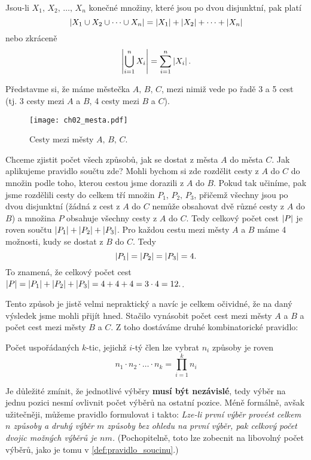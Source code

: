 \begin{theorem}
    Jsou-li $X_1,\,X_2,\,\dots,\,X_n$ konečné množiny, které jsou po dvou disjunktní, pak platí
    \begin{equation*}
        \left| X_1\cup X_2\cup\dots\cup X_n \right|=\left| X_1 \right|+\left| X_2 \right|+\dots+\left| X_n \right|
    \end{equation*}
    nebo zkráceně
    \begin{equation*}
        \left| \bigcup\limits_{i=1}^{n}X_i \right|=\sum_{i=1}^{n}\left| X_i \right|.
    \end{equation*}
\end{theorem}

Představme si, že máme městečka $A,\,B,\,C$, mezi nimiž vede po řadě 3 a 5 cest (tj. 3 cesty mezi $A$ a $B$, 4 cesty mezi $B$ a $C$).

\begin{figure}[H]
	\centering
	\texttt{[image: ch02\_mesta.pdf]}
    \caption{Cesty mezi městy $A,\,B,\,C$.}
    \label{fig:mesta}
\end{figure}

Chceme zjistit počet všech způsobů, jak se dostat z města $A$ do města $C$. Jak aplikujeme pravidlo součtu zde? Mohli bychom si zde rozdělit cesty z $A$ do $C$ do množin podle toho, kterou cestou jsme dorazili z $A$ do $B$. Pokud tak učiníme, pak jsme rozdělili cesty do celkem tří množin $P_1,\,P_2,\,P_3$, přičemž všechny jsou po dvou disjunktní (žádná z cest z $A$ do $C$ nemůže obsahovat dvě různé cesty z $A$ do $B$) a množina $P$ obsahuje všechny cesty z $A$ do $C$. Tedy celkový počet cest $\left| P \right|$ je roven součtu $\left| P_1 \right|+\left| P_2 \right|+\left| P_3 \right|$. Pro každou cestu mezi městy $A$ a $B$ máme 4 možnosti, kudy se dostat z $B$ do $C$. Tedy
\begin{equation*}
    \left| P_1 \right|=\left| P_2 \right|=\left| P_3 \right|=4.
\end{equation*}
To znamená, že celkový počet cest $\left| P \right|=\left| P_1 \right|+\left| P_2 \right|+\left| P_3 \right|=4+4+4=3\cdot 4=12.$.\par
Tento způsob je jistě velmi nepraktický a navíc je celkem očividné, že na daný výsledek jsme mohli přijít hned. Stačilo vynásobit počet cest mezi městy $A$ a $B$ a počet cest mezi městy $B$ a $C$. Z toho dostáváme druhé kombinatorické pravidlo:

\begin{theorem}\label{def:pravidlo_soucinu}
    Počet uspořádaných $k$-tic, jejichž $i$-tý člen lze vybrat $n_i$ způsoby je roven
    \begin{equation*}
        n_1\cdot n_2\cdot\dots\cdot n_k = \prod_{i=1}^{k}n_i
    \end{equation*}
\end{theorem}
Je důležité zmínit, že jednotlivé výběry \textbf{musí být nezávislé}, tedy výběr na jednu pozici nesmí ovlivnit počet výběrů na ostatní pozice. Méně formálně, avšak užitečněji, můžeme pravidlo formulovat i takto: \textit{Lze-li první výběr provést celkem $n$ způsoby a druhý výběr $m$ způsoby bez ohledu na první výběr, pak celkový počet dvojic možných výběrů je $nm$.} (Pochopitelně, toto lze zobecnit na libovolný počet výběrů, jako je tomu v \ref{def:pravidlo_soucinu}.)

